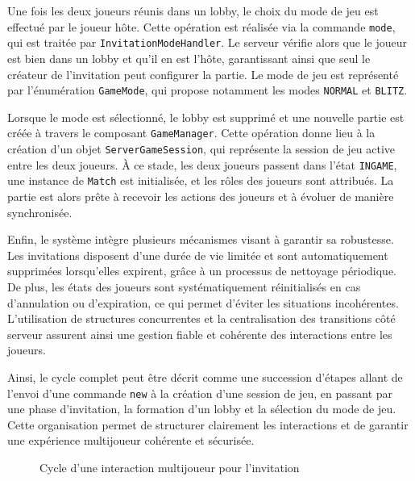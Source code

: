 \documentclass[a4paper]{article}
\begin{document}
Une fois les deux joueurs réunis dans un lobby, le choix du mode de jeu est effectué par le joueur hôte. Cette opération est réalisée via la commande \texttt{mode}, qui est traitée par \texttt{InvitationModeHandler}. Le serveur vérifie alors que le joueur est bien dans un lobby et qu’il en est l’hôte, garantissant ainsi que seul le créateur de l’invitation peut configurer la partie. Le mode de jeu est représenté par l’énumération \texttt{GameMode}, qui propose notamment les modes \texttt{NORMAL} et \texttt{BLITZ}.

Lorsque le mode est sélectionné, le lobby est supprimé et une nouvelle partie est créée à travers le composant \texttt{GameManager}. Cette opération donne lieu à la création d’un objet \texttt{ServerGameSession}, qui représente la session de jeu active entre les deux joueurs. À ce stade, les deux joueurs passent dans l’état \texttt{INGAME}, une instance de \texttt{Match} est initialisée, et les rôles des joueurs sont attribués. La partie est alors prête à recevoir les actions des joueurs et à évoluer de manière synchronisée.

Enfin, le système intègre plusieurs mécanismes visant à garantir sa robustesse. Les invitations disposent d’une durée de vie limitée et sont automatiquement supprimées lorsqu’elles expirent, grâce à un processus de nettoyage périodique. De plus, les états des joueurs sont systématiquement réinitialisés en cas d’annulation ou d’expiration, ce qui permet d’éviter les situations incohérentes. L’utilisation de structures concurrentes et la centralisation des transitions côté serveur assurent ainsi une gestion fiable et cohérente des interactions entre les joueurs.

Ainsi, le cycle complet peut être décrit comme une succession d’étapes allant de l’envoi d’une commande \texttt{new} à la création d’une session de jeu, en passant par une phase d’invitation, la formation d’un lobby et la sélection du mode de jeu. Cette organisation permet de structurer clairement les interactions et de garantir une expérience multijoueur cohérente et sécurisée.

\begin{figure}[H]
\centering
{}
\caption{Cycle d’une interaction multijoueur pour l’invitation}
\label{fig:cycle_zigzag_left}
\end{figure}
\end{document}
